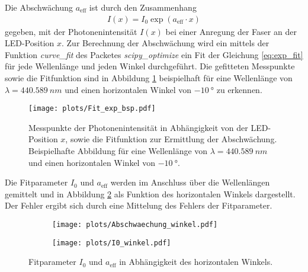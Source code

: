 Die Abschwächung $a_\mathrm{eff}$ ist durch den Zusammenhang 
\begin{align}
    I(x) = I_{0} \exp(a_\mathrm{eff} \cdot x)
    \label{eq:exp_fit}
\end{align}
gegeben, mit der Photonenintensität $I(x)$ bei einer Anregung der Faser an der LED-Position $x$. Zur Berechnung der Abschwächung wird ein mittels der Funktion \textit{curve\_fit} des Packetes \textit{scipy\_optimize} ein Fit der Gleichung \eqref{eq:exp_fit} für jede Wellenlänge und jeden Winkel durchgeführt. Die gefitteten Messpunkte sowie die Fitfunktion sind in Abbildung \ref{fig:Fit_exp_bsp} beispielhaft für eine Wellenlänge von $\lambda = \SI{440.589}{nm}$ und einen horizontalen Winkel von $\SI{-10}{°}$ zu erkennen.
\begin{figure}
    \centering
    \texttt{[image: plots/Fit\_exp\_bsp.pdf]}
    \caption{Messpunkte der Photonenintensität in Abhängigkeit von der LED-Position $x$, sowie die Fitfunktion zur Ermittlung der Abschwächung. Beispielhafte Abbildung für eine Wellenlänge von $\lambda = \SI{440.589}{nm}$ und einen horizontalen Winkel von $\SI{-10}{°}$.}
    \label{fig:Fit_exp_bsp}
\end{figure}
\FloatBarrier
Die Fitparameter $I_0$ und $a_\mathrm{eff}$ werden im Anschluss über die Wellenlängen gemittelt und in Abbildung \ref{fig:a_I0_winkel} als Funktion des horizontalen Winkels dargestellt. Der Fehler ergibt sich durch eine Mittelung des Fehlers der Fitparameter.
\begin{figure}
    \begin{subfigure}[c]{0.5\textwidth}    
        \texttt{[image: plots/Abschwaechung\_winkel.pdf]}
    \end{subfigure}
    \begin{subfigure}[c]{0.5\textwidth}
        \texttt{[image: plots/I0\_winkel.pdf]}
    \end{subfigure}
    \caption{Fitparameter $I_0$ und $a_\mathrm{eff}$ in Abhängigkeit des horizontalen Winkels.}
    \label{fig:a_I0_winkel}
\end{figure}

